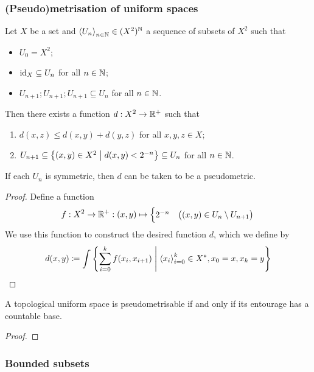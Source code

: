 \subsubsection{(Pseudo)metrisation of uniform spaces}
\begin{lemma}
Let $X$ be a set and $\left\langle U_n \right\rangle_{n\in \mathbb{N}}\in (X^2)^{\mathbb{N}}$ a sequence of subsets of $X^2$ such that
\begin{itemize}
\item $U_0 = X^2$;
\item $\operatorname{id}_X \subseteq U_n$ for all $n\in\mathbb{N}$;
\item $U_{n+1};U_{n+1};U_{n+1} \subseteq U_n$ for all $n\in\mathbb{N}$.
\end{itemize}
Then there exists a function $d: X^2 \to \mathbb{R}^+$ such that
\begin{enumerate}
\item $d(x,z) \leq d(x,y)+d(y,z)$ for all $x,y,z\in X$;
\item $U_{n+1} \subseteq \left\{ (x,y)\in X^2 \;\middle|\; d(x,y)< 2^{-n} \right\} \subseteq U_{n}$ for all $n\in\mathbb{N}$.
\end{enumerate}
If each $U_n$ is symmetric, then $d$ can be taken to be a pseudometric.
\end{lemma}
\begin{proof}
Define a function
\[ f: X^2 \to \mathbb{R}^+: (x,y) \mapsto \begin{cases}
2^{-n} & \big((x,y)\in U_{n}\setminus U_{n+1}\big)
\end{cases} \]
We use this function to construct the desired function $d$, which we define by
\[ d(x,y) \coloneqq \int\left\{ \sum_{i=0}^k f(x_i, x_{i+1}) \;\middle|\; \left\langle x_i \right\rangle_{i=0}^k\in X^*, x_0 = x, x_k = y \right\} \]
\end{proof}

\begin{theorem}
A topological uniform space is pseudometrisable \textup{if and only if} its entourage has a countable base.
\end{theorem}
\begin{proof}

\end{proof}

\begin{proposition}

\end{proposition}

\subsubsection{Bounded subsets}

